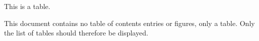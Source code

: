 \documentclass[lot,lof]{fithesis3}
\begin{document}
  \begin{table}
    \caption{This is a table.}
  \end{table}
  This document contains no table of contents entries or figures,
  only a table. Only the list of tables should therefore be
  displayed.
\end{document}
